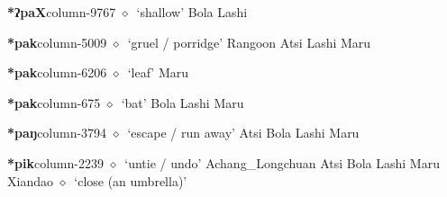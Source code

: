   \item {\footnotesize \textbf{*ʔpaX}}{\tiny column-9767}
         $\diamond$~`shallow'
         Bola 
\hspace{1ex}
         Lashi 
  \item {\footnotesize \textbf{*pak}}{\tiny column-5009}
         $\diamond$~`gruel / porridge'
         Rangoon 
\hspace{1ex}
         Atsi 
\hspace{1ex}
         Lashi 
\hspace{1ex}
         Maru 
  \item {\footnotesize \textbf{*pak}}{\tiny column-6206}
         $\diamond$~`leaf'
         Maru 
  \item {\footnotesize \textbf{*pak}}{\tiny column-675}
         $\diamond$~`bat'
         Bola 
\hspace{1ex}
         Lashi 
\hspace{1ex}
         Maru 
  \item {\footnotesize \textbf{*paŋ}}{\tiny column-3794}
         $\diamond$~`escape / run away'
         Atsi 
\hspace{1ex}
         Bola 
\hspace{1ex}
         Lashi 
\hspace{1ex}
         Maru 
  \item {\footnotesize \textbf{*pik}}{\tiny column-2239}
         $\diamond$~`untie / undo'
         Achang\_Longchuan 
\hspace{1ex}
         Atsi 
\hspace{1ex}
         Bola 
\hspace{1ex}
         Lashi 
\hspace{1ex}
         Maru 
\hspace{1ex}
         Xiandao 
\hspace{1ex}
         $\diamond$~`close (an umbrella)'

